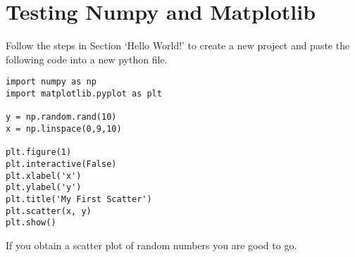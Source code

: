 \documentclass{article}
\begin{document}
\section{Testing Numpy and Matplotlib}

Follow the steps in Section `Hello World!' to create a new project and paste the following code into a new python file.

\begin{lstlisting}
import numpy as np
import matplotlib.pyplot as plt

y = np.random.rand(10)
x = np.linspace(0,9,10)

plt.figure(1)
plt.interactive(False)
plt.xlabel('x')
plt.ylabel('y')
plt.title('My First Scatter')
plt.scatter(x, y)
plt.show()

\end{lstlisting}

If you obtain a scatter plot of random numbers you are good to go.
\end{document}
